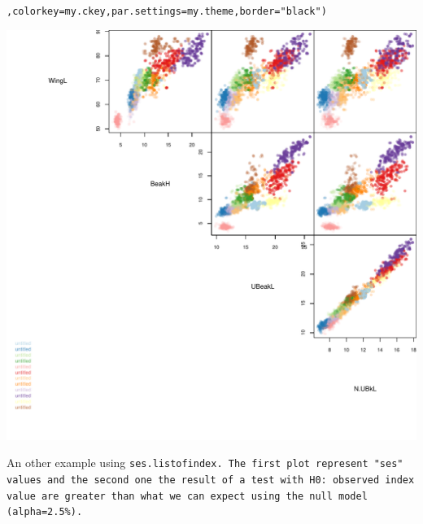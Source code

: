 \documentclass[12pt]{article}\usepackage[]{graphicx}\usepackage[]{color}
\makeatletter
\def\maxwidth{ %
  \ifdim\Gin@nat@width>\linewidth
    \linewidth
  \else
    \Gin@nat@width
  \fi
}
\newcommand{\hlstr}[1]{\textcolor[rgb]{0.192,0.494,0.8}{#1}}%
\newcommand{\hlstd}[1]{\textcolor[rgb]{0.345,0.345,0.345}{#1}}%
\newcommand{\hlkwc}[1]{\textcolor[rgb]{0.333,0.667,0.333}{#1}}%
\newenvironment{kframe}{%
 \def\at@end@of@kframe{}%
 \ifinner\ifhmode%
  \def\at@end@of@kframe{\end{minipage}}%
  \begin{minipage}{\columnwidth}%
 \fi\fi%
 \def\FrameCommand##1{\hskip\@totalleftmargin \hskip-\fboxsep
 \colorbox{shadecolor}{##1}\hskip-\fboxsep
     \hskip-\linewidth \hskip-\@totalleftmargin \hskip\columnwidth}%
 \MakeFramed {\advance\hsize-\width
   \@totalleftmargin\z@ \linewidth\hsize
   \@setminipage}}%
 {\par\unskip\endMakeFramed%
 \at@end@of@kframe}
\newenvironment{knitrout}{}{} %
\makeatother
\begin{document}
\begin{knitrout}
\begin{kframe}
\begin{alltt}
          \hlstd{,} \hlkwc{colorkey}\hlstd{=my.ckey,} \hlkwc{par.settings}\hlstd{=my.theme,}\hlkwc{border}\hlstd{=}\hlstr{"black"}\hlstd{)}
\end{alltt}
\end{kframe}
\includegraphics[width=\maxwidth]{figure/unnamed-chunk-552} 

\end{knitrout}

An other example using \tt{ses.listofindex}. The first plot represent "ses" values and the second one the result of a test with H0: observed index value are greater than what we can expect using the null model (alpha=2.5\%).
\end{document}
